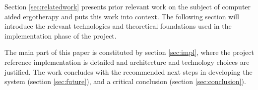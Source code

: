 Section \ref{sec:relatedwork} presents prior relevant work on the subject of computer aided ergotherapy and puts this work into context. The following section will introduce the relevant technologies and theoretical foundations used in the implementation phase of the project.

The main part of this paper is constituted by section \ref{sec:impl}, where the project reference implementation is detailed and architecture and technology choices are justified. The work concludes with the recommended next steps in developing the system (section \ref{sec:future}), and a critical conclusion (section \ref{sec:conclusion}).

